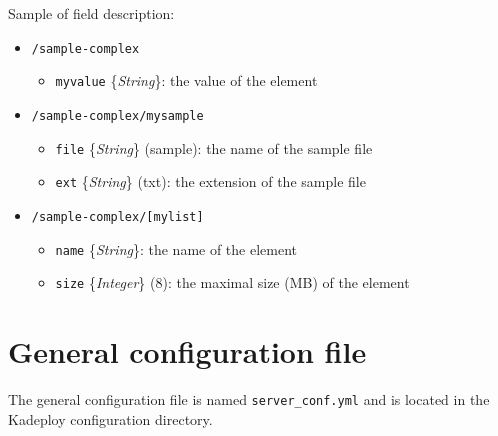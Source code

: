 \documentclass[a4wide,10pt,oneside]{book}
\newcommand{\ypath}[1]{\texttt{#1}}
\newcommand{\yfield}[2]{\texttt{#1} {\small\{{\emph{#2}}\}}:}
\newcommand{\yfieldd}[3]{\texttt{#1} {\small\{{\emph{#2}}\}} {\small(}#3{\small)}:}
\begin{document}
Sample of field description:
\begin{itemize}
  \item \ypath{/sample-complex}
  \begin{itemize}
    \item \yfield{myvalue}{String} the value of the element
  \end{itemize}
  \item \ypath{/sample-complex/mysample}
  \begin{itemize}
    \item \yfieldd{file}{String}{sample} the name of the sample file
    \item \yfieldd{ext}{String}{txt} the extension of the sample file
  \end{itemize}
  \item \ypath{/sample-complex/[mylist]}
  \begin{itemize}
    \item \yfield{name}{String} the name of the element
    \item \yfieldd{size}{Integer}{8} the maximal size (MB) of the element
  \end{itemize}
\end{itemize}

\section{General configuration file}\label{sec:general_config}
The general configuration file is named \texttt{server\_conf.yml} and is located in the Kadeploy configuration directory.
\end{document}
